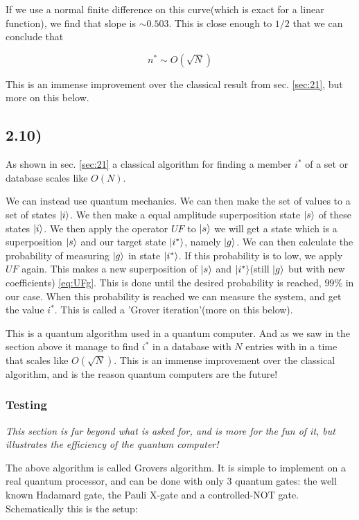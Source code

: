 \documentclass[a4paper,norsk, 10pt]{article}
\begin{document}
If we use a normal finite difference on this curve(which is exact for a linear function), we find that slope is $\sim 0.503$. This is close enough to $1/2$ that we can conclude that

\begin{equation}
n^* \sim O(\sqrt{N})
\end{equation}

This is an immense improvement over the classical result from sec. \ref{sec:21}, but more on this below.


\subsection{2.10)}
As shown in sec. \ref{sec:21} a classical algorithm for finding a member $i^*$ of a set or database scales like $O(N)$.

We can instead use quantum mechanics. We can then make the set of values to a set of states $\ket{i}$. We then make a equal amplitude superposition state $\ket{s}$ of these states $\ket{i}$. We then apply the operator $UF$ to $\ket{s}$ we will get a state which is a superposition $\ket{s}$ and our target state $\ket{i^*}$, namely $\ket{g}$. We can then calculate the probability of measuring $\ket{g}$ in state $\ket{i^*}$. If this probability is to low, we apply $UF$ again. This makes a new superposition of $\ket{s}$ and $\ket{i^*}$(still $\ket{g}$ but with new coefficients) \ref{eq:UFg}. This is done until the desired probability is reached, $99\%$ in our case. When this probability is reached we can measure the system, and get the value $i^*$. This is called a 'Grover iteration'(more on this below).

This is a quantum algorithm used in a quantum computer. And as we saw in the section above it manage to find $i^*$ in a database with $N$ entries with in a time that scales like $O(\sqrt{N})$. This is an immense improvement over the classical algorithm, and is the reason quantum computers are the future!
\newpage

\subsubsection{Testing}
\textit{This section is far beyond what is asked for, and is more for the fun of it, but illustrates the efficiency of the quantum computer!}

The above algorithm is called Grovers algorithm. It is simple to implement on a real quantum processor, and can be done with only 3 quantum gates: the well known Hadamard gate, the Pauli X-gate and a controlled-NOT gate. Schematically this is the setup:
\end{document}

